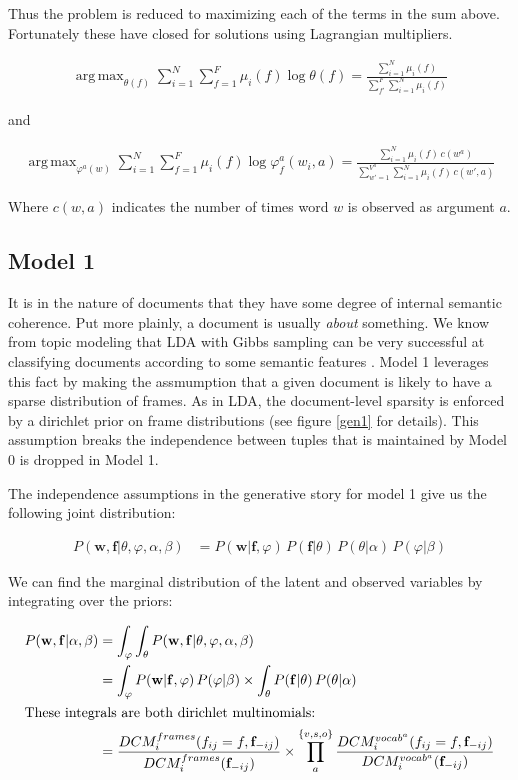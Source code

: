 \documentclass{article} %
\renewcommand\phi\varphi
\DeclareMathOperator*{\argmax}{arg\,max}
\begin{document}
Thus the problem is reduced to maximizing each of the terms in the sum above. Fortunately
these have closed for solutions using Lagrangian multipliers.


\begin{align}
\argmax_{\theta(f)}\sum_{i=1}^N\sum_{f=1}^F\mu_i(f)\log\theta(f)
= \frac{\sum_{i=1}^N\mu_i(f)}{\sum_{f'}^F\sum_{i=1}^N\mu_i(f)}
\end{align}

and

\begin{align}
\argmax_{\phi^a(w)}\sum_{i=1}^N\sum_{f=1}^F\mu_i(f)\log \phi_f^a(w_i,a)
= \frac{\sum_{i=1}^N \mu_i(f)\,c(w^a)}{\sum_{w'=1}^{V^a}\sum_{i=1}^N \mu_i(f)\,c(w',a)}
\end{align}

Where $c(w,a)$ indicates the number of times word $w$ is observed as argument $a$.

\subsection{Model 1}

It is in the nature of documents that they have some degree of internal semantic
coherence. Put more plainly, a document is usually \emph{about} something. We
know from topic modeling that LDA with Gibbs sampling can be very successful at
classifying documents according to some semantic features \citep{blei2003}.
Model 1 leverages this fact by making the assmumption that a given document is 
likely to have a sparse distribution of frames. As in LDA, the document-level
sparsity is enforced by a dirichlet prior on frame distributions (see figure
\ref{gen1} for details). This assumption breaks the independence between tuples 
that is maintained by Model 0 is dropped in Model 1.

The independence assumptions in the generative story for model 1 give us the 
following joint distribution:

\begin{align*}
P(\mathbf{w},\mathbf{f}|\theta,\phi,\alpha,\beta)
&=P(\mathbf{w}|\mathbf{f},\phi)\,P(\mathbf{f}|\theta)\,P(\theta|\alpha)\,P(\phi|\beta)
\end{align*}

We can find the marginal distribution of the latent and observed variables by
integrating over the priors:

\begin{align*}
 P(\mathbf{w},\mathbf{f}|\alpha,\beta)
&=\int_\phi\int_\theta P(\mathbf{w},\mathbf{f}|\theta,\phi,\alpha,\beta)\\
&=     \int_\phi P(\mathbf{w}|\mathbf{f},\phi )\,P(\phi|\beta)
\times \int_\theta P(\mathbf{f}|\theta)\,P(\theta|\alpha)\\
\intertext{These integrals are both dirichlet multinomials:}
&=\frac{DCM_i^{frames}(f_{ij}=f, \mathbf{f}_{-ij})}{DCM_i^{frames}(\mathbf{f}_{-ij})}\times
\prod_a^{\{v,s,o\}}\frac{DCM_i^{vocab^a}(f_{ij}=f, \mathbf{f}_{-ij})}{DCM_i^{vocab^a}(\mathbf{f}_{-ij})}
\end{align*}
\end{document}
